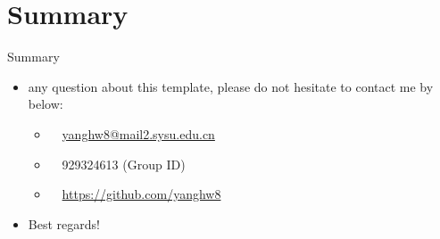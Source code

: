 \documentclass{beamer}
\begin{document}
\section{Summary}

\begin{frame}{Summary}
    \begin{itemize}
    \item any question about this template, please do not hesitate to contact me by below:
        \begin{itemize}
            \item \faEnvelope~~\href{mailto:yanghw8@mail2.sysu.edu.cn}{yanghw8@mail2.sysu.edu.cn}\
            \item \faQq~~929324613 (Group ID)
            \item \faGithub~~\url{https://github.com/yanghw8}\
        \end{itemize}
    \item Best regards!
    \end{itemize}
\end{frame}

\backmatter
\end{document}
